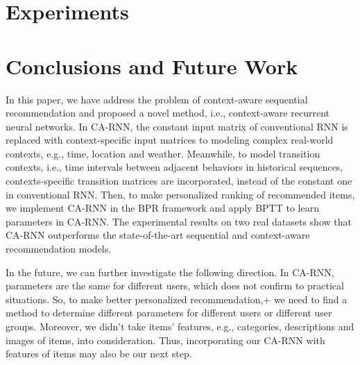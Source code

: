 \documentclass{sig-alternate}
\begin{document}
\section{Experiments}

\section{Conclusions and Future Work}

In this paper, we have address the problem of context-aware sequential recommendation and proposed a novel method, i.e., context-aware recurrent neural networks. In CA-RNN, the constant input matrix of conventional RNN is replaced with context-specific input matrices to modeling complex real-world contexts, e.g., time, location and weather. Meanwhile, to model transition contexts, i.e., time intervals between adjacent behaviors in historical sequences, contexts-specific transition matrices are incorporated, instead of the constant one in conventional RNN. Then, to make personalized ranking of recommended items, we implement CA-RNN in the BPR framework and apply BPTT to learn parameters in CA-RNN. The experimental results on two real datasets show that CA-RNN outperforms the state-of-the-art sequential and context-aware recommendation models.

In the future, we can further investigate the following direction. In CA-RNN, parameters are the same for different users, which does not confirm to practical situations. So, to make better personalized recommendation,+ we need to find a method to determine different parameters for different users or different user groups. Moreover, we didn't take items' features, e.g., categories, descriptions and images of items, into consideration. Thus, incorporating our CA-RNN with features of items may also be our next step.

\small


\vspace{2cm}

\balancecolumns
\end{document}
